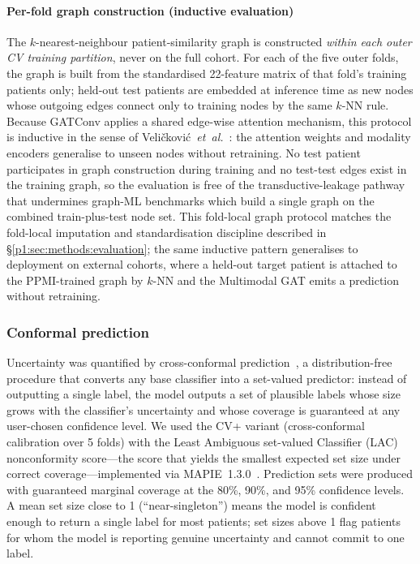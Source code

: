 \documentclass[10pt,letterpaper]{article}
\begin{document}
\paragraph*{Per-fold graph construction (inductive evaluation)} The $k$-nearest-neighbour patient-similarity graph is constructed \emph{within each outer CV training partition}, never on the full cohort. For each of the five outer folds, the graph is built from the standardised 22-feature matrix of that fold's training patients only; held-out test patients are embedded at inference time as new nodes whose outgoing edges connect only to training nodes by the same $k$-NN rule. Because GATConv applies a shared edge-wise attention mechanism, this protocol is inductive in the sense of Veli\v{c}kovi\'{c}~\textit{et~al.}~\cite{velickovic2018gat}: the attention weights and modality encoders generalise to unseen nodes without retraining. No test patient participates in graph construction during training and no test-test edges exist in the training graph, so the evaluation is free of the transductive-leakage pathway that undermines graph-ML benchmarks which build a single graph on the combined train-plus-test node set. This fold-local graph protocol matches the fold-local imputation and standardisation discipline described in \S\ref{p1:sec:methods:evaluation}; the same inductive pattern generalises to deployment on external cohorts, where a held-out target patient is attached to the PPMI-trained graph by $k$-NN and the Multimodal GAT emits a prediction without retraining.

\subsubsection*{Conformal prediction}
Uncertainty was quantified by cross-conformal prediction~\cite{vovk2022,shafer2008,angelopoulos2021}, a distribution-free procedure that converts any base classifier into a set-valued predictor: instead of outputting a single label, the model outputs a set of plausible labels whose size grows with the classifier's uncertainty and whose coverage is guaranteed at any user-chosen confidence level. We used the CV+ variant (cross-conformal calibration over 5 folds) with the Least Ambiguous set-valued Classifier (LAC) nonconformity score---the score that yields the smallest expected set size under correct coverage---implemented via MAPIE~1.3.0~\cite{mapie2022}. Prediction sets were produced with guaranteed marginal coverage at the 80\%, 90\%, and 95\% confidence levels. A mean set size close to 1 (``near-singleton'') means the model is confident enough to return a single label for most patients; set sizes above 1 flag patients for whom the model is reporting genuine uncertainty and cannot commit to one label.
\end{document}
